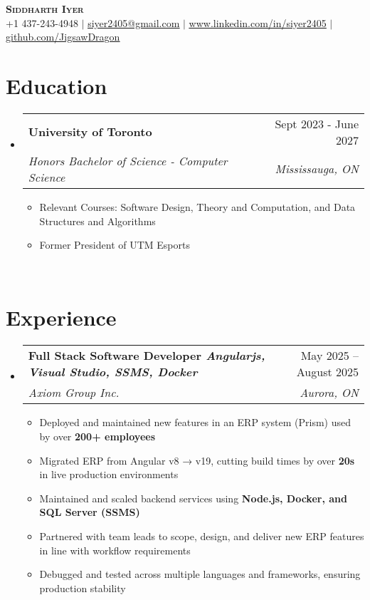 \documentclass[letterpaper,11pt]{article}
\makeatletter
\newcommand{\resumeItem}[1]{
  \item\small{
    {#1 \vspace{-2pt}}
  }
}
\newcommand{\resumeSubheading}[4]{
  \vspace{-2pt}\item
    \begin{tabular*}{0.97\textwidth}[t]{l@{\extracolsep{\fill}}r}
      \textbf{#1} & #2 \\
      \textit{\small#3} & \textit{\small #4} \\
    \end{tabular*}\vspace{-7pt}
}
\newcommand{\resumeSubHeadingListStart}{\begin{itemize}[leftmargin=0.15in, label={}]}
\newcommand{\resumeSubHeadingListEnd}{\end{itemize}}
\newcommand{\resumeItemListStart}{\begin{itemize}}
\newcommand{\resumeItemListEnd}{\end{itemize}\vspace{-5pt}}
\makeatother
\begin{document}

\begin{center}
    \textbf{\Huge \scshape Siddharth Iyer} \\ \vspace{1pt}
    \small +1 437-243-4948 $|$ \href{mailto:x@x.com}{\underline{siyer2405@gmail.com}} $|$ 
    \href{https://linkedin.com/in/...}{\underline{www.linkedin.com/in/siyer2405}} $|$
    \href{https://github.com/...}{\underline{github.com/JigsawDragon}}
\end{center}


\section{Education}
  \resumeSubHeadingListStart
    \resumeSubheading
      {University of Toronto}{Sept 2023 - June 2027}
      {Honors Bachelor of Science -  Computer Science}{Mississauga, ON}
    \resumeItemListStart
        \resumeItem{Relevant Courses: Software Design, Theory and Computation, and Data Structures and Algorithms}
        \resumeItem{Former President of UTM Esports}
    \resumeItemListEnd
    \resumeSubHeadingListEnd
\
\section{Experience}
\resumeSubHeadingListStart
    \resumeSubheading
      {Full Stack Software Developer \textnormal{\emph{Angularjs, Visual Studio, SSMS, Docker}}}{ May 2025 -- August 2025}
      {Axiom Group Inc.}{Aurora, ON}
      \resumeItemListStart
      \resumeItem{Deployed and maintained new features in an ERP system (Prism) used by over \textbf{200+ employees}}
      \resumeItem{Migrated ERP from Angular v8 → v19, cutting build times by over \textbf{20s} in live production environments}
      \resumeItem{Maintained and scaled backend services using \textbf{Node.js, Docker, and SQL Server (SSMS)}}
      \resumeItem{Partnered with team leads to scope, design, and deliver new ERP features in line with workflow requirements}
      \resumeItem{Debugged and tested across multiple languages and frameworks, ensuring production stability}
      \resumeItemListEnd
  \resumeSubHeadingListEnd
    
\end{document}
